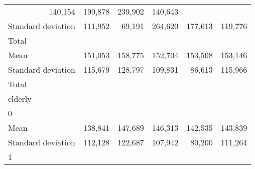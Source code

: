\begin{tabular}{llllll}
  \multicolumn{1}{r}{140,154} &
  \multicolumn{1}{r}{190,878} &
  \multicolumn{1}{r}{239,902} &
  \multicolumn{1}{r}{140,643} \\
\multicolumn{1}{l}{\hspace{4em}Standard deviation} &
  \multicolumn{1}{|r}{111,952} &
  \multicolumn{1}{r}{69,191} &
  \multicolumn{1}{r}{264,620} &
  \multicolumn{1}{r}{177,613} &
  \multicolumn{1}{r}{119,776} \\
\multicolumn{1}{l}{\hspace{3em}Total} &
  \multicolumn{1}{|r}{} &
  \multicolumn{1}{r}{} &
  \multicolumn{1}{r}{} &
  \multicolumn{1}{r}{} &
  \multicolumn{1}{r}{} \\
\multicolumn{1}{l}{\hspace{4em}Mean} &
  \multicolumn{1}{|r}{151,053} &
  \multicolumn{1}{r}{158,775} &
  \multicolumn{1}{r}{152,704} &
  \multicolumn{1}{r}{153,508} &
  \multicolumn{1}{r}{153,146} \\
\multicolumn{1}{l}{\hspace{4em}Standard deviation} &
  \multicolumn{1}{|r}{115,679} &
  \multicolumn{1}{r}{128,797} &
  \multicolumn{1}{r}{109,831} &
  \multicolumn{1}{r}{86,613} &
  \multicolumn{1}{r}{115,966} \\
\multicolumn{1}{l}{\hspace{1em}Total} &
  \multicolumn{1}{|r}{} &
  \multicolumn{1}{r}{} &
  \multicolumn{1}{r}{} &
  \multicolumn{1}{r}{} &
  \multicolumn{1}{r}{} \\
\multicolumn{1}{l}{\hspace{2em}elderly} &
  \multicolumn{1}{|r}{} &
  \multicolumn{1}{r}{} &
  \multicolumn{1}{r}{} &
  \multicolumn{1}{r}{} &
  \multicolumn{1}{r}{} \\
\multicolumn{1}{l}{\hspace{3em}0} &
  \multicolumn{1}{|r}{} &
  \multicolumn{1}{r}{} &
  \multicolumn{1}{r}{} &
  \multicolumn{1}{r}{} &
  \multicolumn{1}{r}{} \\
\multicolumn{1}{l}{\hspace{4em}Mean} &
  \multicolumn{1}{|r}{138,841} &
  \multicolumn{1}{r}{147,689} &
  \multicolumn{1}{r}{146,313} &
  \multicolumn{1}{r}{142,535} &
  \multicolumn{1}{r}{143,839} \\
\multicolumn{1}{l}{\hspace{4em}Standard deviation} &
  \multicolumn{1}{|r}{112,128} &
  \multicolumn{1}{r}{122,687} &
  \multicolumn{1}{r}{107,942} &
  \multicolumn{1}{r}{80,200} &
  \multicolumn{1}{r}{111,264} \\
\multicolumn{1}{l}{\hspace{3em}1} &

\end{tabular}
